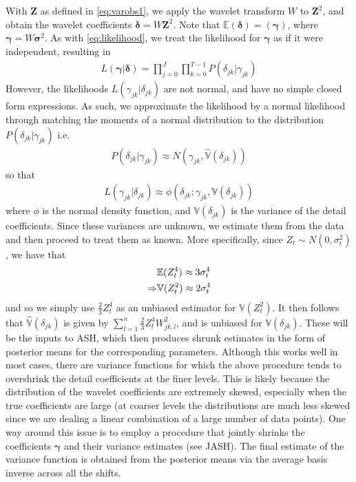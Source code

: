\documentclass[12pt]{article}
\newcommand{\Gg}{\gamma}     \newcommand{\GG}{\Gamma}
\newcommand{\Gd}{\delta}     \newcommand{\GD}{\Delta}
\newcommand{\s}{\sigma}
\begin{document}
\begin{appendices}
With $\bm{Z}$ as defined in \eqref{eq:varobs1}, we apply the wavelet transform $W$ to $\bm{Z}^2$, and obtain the wavelet coefficients $\bm{\Gd}=W\bm{Z}^2$. Note that $\mathbb{E}(\bm{\Gd})=(\bm{\Gg})$, where $\bm{\Gg}=W\bm{\s}^2$. As with \eqref{eq:likelihood}, we treat the likelihood for $\bm{\Gg}$ as if it were independent, resulting in
\begin{eqnarray}
L(\bm{\Gg}|\bm{\Gd})=\prod_{j=0}^J\prod_{k=0}^{T-1}P(\Gd_{jk}|\Gg_{jk})
\end{eqnarray}
However, the likelihoods $L(\Gg_{jk}|\Gd_{jk})$ are not normal, and have no simple closed form expressions. As such, we approximate the likelihood by a normal likelihood through matching the moments of a normal distribution to the distribution $P(\Gd_{jk}|\Gg_{jk})$ i.e.
\begin{eqnarray}
P(\Gd_{jk}|\Gg_{jk})\approx N(\Gg_{jk},\hat{\mathbb{V}}(\Gd_{jk}))
\end{eqnarray}
so that
\begin{eqnarray}\label{eq:gaus approx}
L(\Gg_{jk}|\Gd_{jk})\approx \phi(\Gd_{jk};\Gg_{jk},\mathbb{V}(\Gd_{jk}))
\end{eqnarray}
where $\phi$ is the normal density function, and $\mathbb{V}(\Gd_{jk})$ is the variance of the detail coefficients. Since these variances are unknown, we estimate them from the data and then proceed to treat them as known. More specifically, since $Z_t\sim N(0,\s_t^2)$, we have that
\begin{eqnarray}
&\mathbb{E}(Z_t^4)\approx 3\s_t^4\notag\\
\label{eq:varvarest}\Rightarrow&\mathbb{V}(Z_t^2)\approx 2\s_t^4
\end{eqnarray}
and so we simply use $\frac{2}{3}Z_t^4$ as an unbiased estimator for $\mathbb{V}(Z_t^2)$. It then follows that $\hat{\mathbb{V}}(\Gd_{jk})$ is given by $\sum_{l=1}^n \frac{2}{3}Z_l^4W_{jk,l}^2$, and is unbiased for $\mathbb{V}(\Gd_{jk})$. These will be the inputs to ASH, which then produces shrunk estimates in the form of posterior means for the corresponding parameters. Although this works well in most cases, there are variance functions for which the above procedure tends to overshrink the detail coefficients at the finer levels. This is likely because the distribution of the wavelet coefficients are extremely skewed, especially when the true coefficients are large (at coarser levels the distributions are much less skewed since we are dealing a linear combination of a large number of data points). One way around this issue is to employ a procedure that jointly shrinks the coefficients $\bm{\Gg}$ and their variance estimates (see JASH). The final estimate of the variance function is obtained from the posterior means via the average basis inverse across all the shifts.


\end{appendices}
\end{document}
